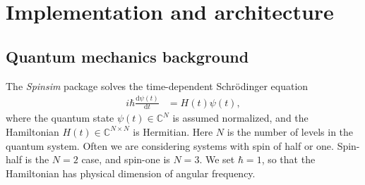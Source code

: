 \documentclass{jors}
\newcommand{\supervisordisagreement}[2]{\textcolor{green}{\texttt{{Supervisor disagreement!!! <<<<<<< Lincoln}}} \textcolor{blue}{#1} \textcolor{green}{\texttt{=======}} \textcolor{red}{#2} \textcolor{green}{\texttt{>>>>>>> James}}}
\begin{document}
\section{Implementation and architecture}
	\subsection{Quantum mechanics background}
		The \emph{Spinsim} package solves the time-dependent Schr\"{o}dinger equation
		\begin{align}
			i\hbar\frac{\mathrm{d}\psi(t)}{\mathrm{d}t} &= H(t)\psi(t),\label{eq:schroedinger}
		\end{align}
		where the quantum state $ \psi(t) \in \mathbb{C}^N $ is assumed normalized, and the Hamiltonian $ H(t) \in \mathbb{C}^{N \times N} $ is Hermitian.
		Here $ N $ is the number of levels in the quantum system.
		Often we are considering systems with spin of half or one.
		Spin-half is the $ N = 2 $ case, and spin-one is $ N = 3 $.
		We set $ \hbar = 1 $, so that the Hamiltonian has physical dimension of angular frequency.
		
		
\end{document}
